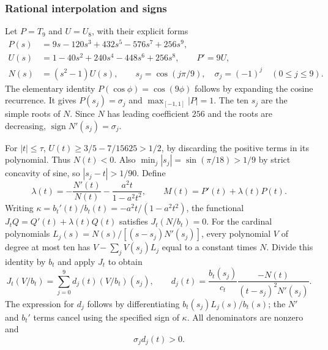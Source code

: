 \documentclass[11pt,a4paper]{article}
\begin{document}
\subsubsection{Rational interpolation and signs}
Let $P=T_9$ and $U=U_8$, with their explicit forms
\begin{equation}\label{eq:chebyshev}
 \begin{split}
 P(s)&=9s-120s^3+432s^5-576s^7+256s^9,\\
 U(s)&=1-40s^2+240s^4-448s^6+256s^8,\qquad P'=9U,\\
 N(s)&=(s^2-1)U(s),\qquad s_j=\cos(j\pi/9),\quad
                         \sigma_j=(-1)^j\quad(0\le j\le9).
 \end{split}
\end{equation}
The elementary identity $P(\cos\phi)=\cos(9\phi)$ follows by
expanding the cosine recurrence. It gives $P(s_j)=\sigma_j$ and
$\max_{[-1,1]}|P|=1$. The ten $s_j$ are the simple roots of $N$.
Since $N$ has leading coefficient $256$ and the roots are decreasing,
$\operatorname{sign}N'(s_j)=\sigma_j$.

For $|t|\le\tau$, $U(t)\ge3/5-7/15625>1/2$, by discarding
the positive terms in its polynomial. Thus $N(t)<0$. Also
$\min_j|s_j|=\sin(\pi/18)>1/9$ by strict concavity of sine,
so $|s_j-t|>1/90$. Define
\begin{equation}\label{eq:lambdamass}
 \lambda(t)=-\frac{N'(t)}{N(t)}-\frac{a^2t}{1-a^2t^2},
 \qquad M(t)=P'(t)+\lambda(t)P(t).
\end{equation}
Writing $\kappa=b_t'(t)/b_t(t)=-a^2t/(1-a^2t^2)$, the
functional $J_tQ=Q'(t)+\lambda(t)Q(t)$ satisfies
$J_t(N/b_t)=0$. For the cardinal polynomials
$L_j(s)=N(s)/[(s-s_j)N'(s_j)]$, every polynomial $V$ of degree
at most ten has $V-\sum_jV(s_j)L_j$ equal to a constant times
$N$. Divide this identity by $b_t$ and apply $J_t$ to obtain
\begin{equation}\label{eq:rationalinterp}
 J_t(V/b_t)=\sum_{j=0}^{9}d_j(t)(V/b_t)(s_j),\qquad
 d_j(t)=\frac{b_t(s_j)}{c_t}
     \frac{-N(t)}{(t-s_j)^2N'(s_j)}.
\end{equation}
The expression for $d_j$ follows by differentiating
$b_t(s_j)L_j(s)/b_t(s)$; the $N'$ and $b_t'$ terms cancel
using the specified sign of $\kappa$. All denominators are nonzero and
\begin{equation}\label{eq:signweights}
 \sigma_jd_j(t)>0.
\end{equation}
\end{document}
